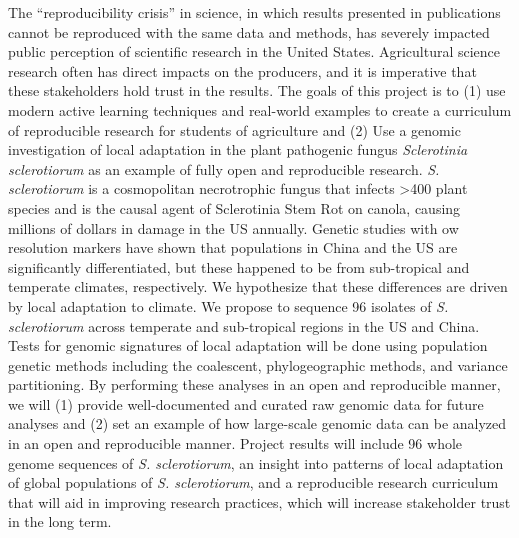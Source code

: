 \documentclass[12pt,letterpaper]{article}
\begin{document}
The ``reproducibility crisis'' in science, in which results presented in publications cannot be reproduced with the same data and methods, has severely impacted public perception of scientific research in the United States.
Agricultural science research often has direct impacts on the producers, and it is imperative that these stakeholders hold trust in the results. 
The goals of this project is to (1) use modern active learning techniques and real-world examples to create a curriculum of reproducible research for students of agriculture and (2) Use a genomic investigation of local adaptation in the plant pathogenic fungus \textit{Sclerotinia sclerotiorum} as an example of fully open and reproducible research.
\textit{S. sclerotiorum} is a cosmopolitan necrotrophic fungus that infects >400 plant species and is the causal agent of Sclerotinia Stem Rot on canola, causing millions of dollars in damage in the US annually.
Genetic studies with ow resolution markers have shown that populations in China and the US are significantly differentiated, but these happened to be from sub-tropical and temperate climates, respectively. 
We hypothesize that these differences are driven by local adaptation to climate. 
We propose to sequence 96 isolates of \textit{S. sclerotiorum} across temperate and sub-tropical regions in the US and China. 
Tests for genomic signatures of local adaptation will be done using population genetic methods including the coalescent, phylogeographic methods, and variance partitioning.
By performing these analyses in an open and reproducible manner, we will (1) provide well-documented and curated raw genomic data for future analyses and (2) set an example of how large-scale genomic data can be analyzed in an open and reproducible manner.
Project results will include 96 whole genome sequences of \textit{S. sclerotiorum}, an insight into patterns of local adaptation of global populations of \textit{S. sclerotiorum}, and a reproducible research curriculum that will aid in improving research practices, which will increase stakeholder trust in the long term.
\end{document}
